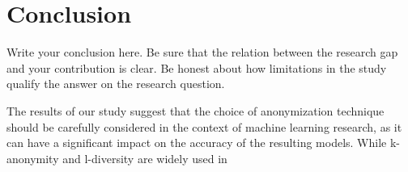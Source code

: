 \section{Conclusion}
\label{sec:conclusion}
Write your conclusion here. Be sure that the relation between the research gap and your contribution is clear. Be honest about how limitations in the study qualify the answer on the research question.

The results of our study suggest that the choice of anonymization technique should be carefully considered in the context of machine learning research, as it can have a significant impact on the accuracy of the resulting models. While k-anonymity and l-diversity are widely used in